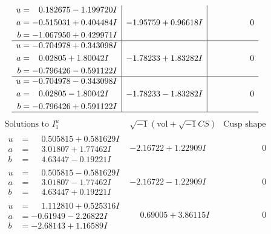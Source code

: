 \documentclass[1p]{elsarticle_modified}
\theoremstyle{definition}
\newcommand{\I}{\sqrt{-1}}
\begin{document}
$$\begin{array}{c|c|c}
\begin{aligned}
u &= \phantom{-}0.182675 - 1.199720 I \\
a &= -0.515031 + 0.404484 I \\
b &= -1.067950 + 0.429971 I\end{aligned}
 & -1.95759 + 0.96618 I & \phantom{-0.000000 } 0 \\ \hline\begin{aligned}
u &= -0.704978 + 0.343098 I \\
a &= \phantom{-}0.02805 + 1.80042 I \\
b &= -0.796426 - 0.591122 I\end{aligned}
 & -1.78233 + 1.83282 I & \phantom{-0.000000 } 0 \\ \hline\begin{aligned}
u &= -0.704978 - 0.343098 I \\
a &= \phantom{-}0.02805 - 1.80042 I \\
b &= -0.796426 + 0.591122 I\end{aligned}
 & -1.78233 - 1.83282 I & \phantom{-0.000000 } 0\\
 \hline 
 \end{array}$$\newpage$$\begin{array}{c|c|c}  
\text{Solutions to }I^u_{1}& \I (\text{vol} + \sqrt{-1}CS) & \text{Cusp shape}\\
 \hline 
\begin{aligned}
u &= \phantom{-}0.505815 + 0.581629 I \\
a &= \phantom{-}3.01807 + 1.77462 I \\
b &= \phantom{-}4.63447 - 0.19221 I\end{aligned}
 & -2.16722 + 1.22909 I & \phantom{-0.000000 } 0 \\ \hline\begin{aligned}
u &= \phantom{-}0.505815 - 0.581629 I \\
a &= \phantom{-}3.01807 - 1.77462 I \\
b &= \phantom{-}4.63447 + 0.19221 I\end{aligned}
 & -2.16722 - 1.22909 I & \phantom{-0.000000 } 0 \\ \hline\begin{aligned}
u &= \phantom{-}1.112810 + 0.525316 I \\
a &= -0.61949 - 2.26822 I \\
b &= -2.68143 + 1.16589 I\end{aligned}
 & \phantom{-}0.69005 + 3.86115 I & \phantom{-0.000000 } 0 \\ \hline\begin{aligned}

\end{aligned}
\end{array}$$
\end{document}
